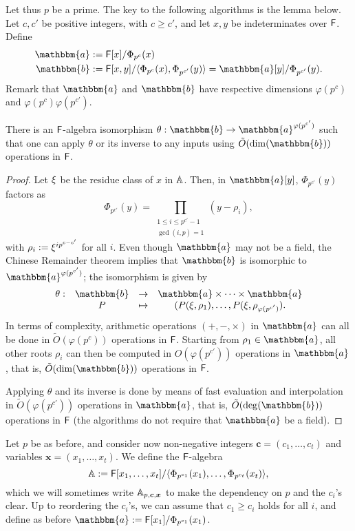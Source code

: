 Let thus $p$ be a prime. The key to the following algorithms is the
lemma below.  Let $c,c'$ be positive integers, with $c \ge
c'$, and let $x,y$ be indeterminates over ${\mathsf{F}}$. Define
\begin{align}
\mathbbm{a}&:=\F[x]/\Phi_{p^c}(x)  \\
\mathbbm{b}&:=\F[x,y]/\langle \Phi_{p^c}(x), \Phi_{p^{c'}}(y)\rangle = \mathbbm{a}[y]/\Phi_{p^{c'}}(y).
\end{align}
Remark that $\mathbbm{a}$ and $\mathbbm{b}$ have respective dimensions
$\varphi(p^c)$ and $\varphi(p^c) \varphi(p^{c'})$.
\begin{lemma}
  There is an ${\mathsf{F}}$-algebra isomorphism $\theta: \mathbbm{b} \to
  \mathbbm{a}^{\varphi(p^{c'})}$ such that one can apply $\theta$ or
  its inverse to any inputs using $\tilde{O}(\dim(\mathbbm{b}))$ operations in ${\mathsf{F}}$.
\end{lemma}
\begin{proof}
  Let $\xi$ be the residue class of
  $x$ in $\mathbb{A}$. Then, in $\mathbbm{a}[y]$, $\Phi_{p^{c'}}(y)$ factors as
  $$\Phi_{p^{c'}}(y) =\prod_{\substack{1 \le i\le p^{c'}-1\\ \gcd(i,p)
      =1}} (y-\rho_i),$$ with $\rho_i:={\xi}^{i p^{c-c'}}$ for all
  $i$.  Even though $\mathbbm{a}$ may not be a field, the Chinese
  Remainder theorem implies that $\mathbbm{b}$ is isomorphic to
  $\mathbbm{a}^{\varphi(p^{c'})}$; the isomorphism is given by
  $$\begin{array}{cccc}
    \theta: & \mathbbm{b} & \to & \mathbbm{a} \times \cdots \times \mathbbm{a} \\
    & P & \mapsto& (P(\xbar,\rho_1),\dots,P(\xbar,\rho_{\varphi(p^{c'})}).
  \end{array}$$
  In terms of complexity, arithmetic operations $(+,-,\times)$ in
  $\mathbbm{a}$ can all be done in $\tilde{O}(\varphi(p^c))$ operations
  in ${\mathsf{F}}$. Starting from $\rho_1 \in \mathbbm{a}$, all other roots
  $\rho_i$ can then be computed in $O(\varphi(p^{c'}))$ operations in
  $\mathbbm{a}$, that is, $\tilde{O}(\dim(\mathbbm{b}))$
  operations in ${\mathsf{F}}$. 
  
Applying $\theta$ and its inverse is done by means of fast evaluation
and interpolation~\cite[Chapter~10]{vzGathen13} in $\tilde{O}(\varphi(p^{c'}))$
operations in $\mathbbm{a}$, that is, $\tilde{O}(\deg(\mathbbm{b}))$ operations in ${\mathsf{F}}$
(the algorithms do not require that $\mathbbm{a}$ be a field).
\end{proof}

\smallskip{}
Let $p$ be as before, and consider now non-negative integers
$\boldsymbol{c}=(c_1,\dots,c_t)$ and variables $\boldsymbol{x}=(x_1,\dots,x_t)$. We
define the ${\mathsf{F}}$-algebra
$$\mathbb{A}:={\mathsf{F}}[x_1,\dots,x_t]/\langle \Phi_{p^{c_1}}(x_1), \dots,
\Phi_{p^{c_t}}(x_t)\rangle,$$ which we will sometimes write
$\mathbb{A}_{p,\boldsymbol{c},\boldsymbol{x}}$ to make the dependency on $p$
and the $c_i$'s clear. Up to reordering the $c_i$'s, we can assume
that $c_1 \ge c_i$ holds for all $i$, and define as before
$\mathbbm{a}:=\F[x_1]/\Phi_{p^{c_1}}(x_1)$.


